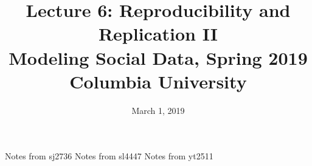 \documentclass{article}
\title{
Lecture 6: Reproducibility and Replication II \\  %
Modeling Social Data, Spring 2019 \\   %
Columbia University                    %
}
\date{March 1, 2019}                %
\makeatletter
\let\org@subfile
\renewcommand*{}[1]{%
  \filename@parse{#1}%
  \expandafter
  \graphicspath\expandafter{\expandafter{\filename@area}}%
  \org@subfile{#1}%
}
\makeatother
\begin{document}
\maketitle


\pagebreak \newpage \noindent\Huge{Notes from sj2736} \normalsize \setcounter{section}{0} 
\pagebreak \newpage \noindent\Huge{Notes from sl4447} \normalsize \setcounter{section}{0} 
\pagebreak \newpage \noindent\Huge{Notes from yt2511} \normalsize \setcounter{section}{0} 
\end{document}
